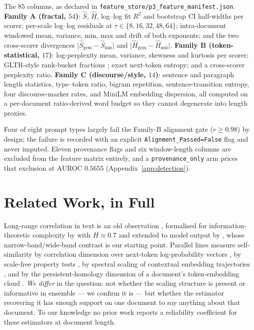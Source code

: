 \documentclass{article}
\newcommand{\Sest}{\ensuremath{\widehat{S}}}
\newcommand{\Hest}{\ensuremath{\widehat{H}}}
\newcommand{\arm}[1]{\texttt{#1}}
\begin{document}
The $85$ columns, as declared in
\texttt{feature\_store/p3\_feature\_manifest.json}.
\textbf{Family A (fractal, $54$)}: \Sest, \Hest, log--log fit $R^2$ and bootstrap
CI half-widths per scorer; per-scale log--log residuals at
$\tau\in\{8,16,32,48,64\}$; intra-document windowed mean, variance, min, max and
drift of both exponents; and the two cross-scorer divergences
$\lvert\Sest_{\text{gem}}-\Sest_{\text{mis}}\rvert$ and
$\lvert\Hest_{\text{gem}}-\Hest_{\text{mis}}\rvert$.
\textbf{Family B (token-statistical, $17$)}: log-perplexity mean, variance,
skewness and kurtosis per scorer; GLTR-style rank-bucket fractions
\citep{gehrmann2019gltr}; exact next-token entropy; and a cross-scorer perplexity
ratio.
\textbf{Family C (discourse/style, $14$)}: sentence and paragraph length
statistics, type--token ratio, bigram repetition, sentence-transition entropy, four
discourse-marker rates, and MiniLM embedding dispersion, all computed on a
per-document ratio-derived word budget so they cannot degenerate into length
proxies.

Four of eight prompt types largely fail the Family-B alignment gate ($r\ge0.98$) by
design; the failure is recorded with an explicit
\texttt{Alignment\_Passed=False} flag and never imputed. Eleven provenance flags
and six window-length columns are excluded from the feature matrix entirely, and a
\arm{provenance\_only} arm prices that exclusion at AUROC $0.5655$
(Appendix~\ref{app:detection}).

\section{Related Work, in Full}
\label{app:related}

Long-range correlation in text is an old observation
\citep{ebeling1993entropy,altmann2012origin}, formalised for
information-theoretic complexity by \citet{alabdulmohsin2024fractal} with
$H\!\approx\!0.7$ and extended to model output by \citet{alabdulmohsin2025tale},
whose narrow-band/wide-band contrast is our starting point. Parallel lines measure
self-similarity by correlation dimension over next-token log-probability vectors
\citep{du2025correlation}, by scale-free property tests
\citep{takahashi2019evaluating,meister2021beyond}, by spectral scaling of
contextual embedding trajectories \citep{yang2026turbulence}, and by the
persistent-homology dimension of a document's token-embedding cloud
\citep{tulchinskii2023intrinsic,wei2025shortphd}. \emph{We differ} in the
question: not whether the scaling structure is present or informative in ensemble
--- we confirm it is --- but whether the estimator recovering it has enough
support on one document to say anything about that document. To our knowledge no
prior work reports a reliability coefficient for these estimators at document
length.
\end{document}
